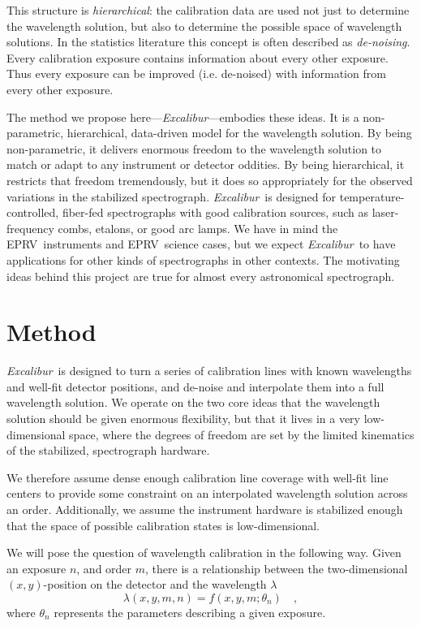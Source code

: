 \documentclass[twocolumn]{aastex63}
\newcommand{\project}[1]{\textsl{#1}}
\newcommand{\name}{\project{Excalibur}}
\newcommand{\acronym}[1]{{\small{#1}}}
\newcommand{\eprv}{\acronym{EPRV}}
\begin{document}
This structure is \emph{hierarchical}: the calibration data are used not just to determine the wavelength solution, but also to determine the possible space of wavelength solutions.  In the statistics literature this concept is often described as \emph{de-noising}.  Every calibration exposure contains information about every other exposure.  Thus every exposure can be improved (i.e. de-noised) with information from every other exposure.

The method we propose here---\name---embodies these ideas.
It is a non-parametric, hierarchical, data-driven model for the wavelength solution.  By being non-parametric, it delivers enormous freedom to the wavelength solution to match or adapt to any instrument or detector oddities.  By being hierarchical, it restricts that freedom tremendously, but it does so appropriately for the observed variations in the stabilized spectrograph.  \name\ is designed for temperature-controlled, fiber-fed spectrographs with good calibration sources, such as laser-frequency combs, etalons, or good arc lamps.  We have in mind the \eprv\ instruments and \eprv\ science cases, but we expect \name\ to have applications for other kinds of spectrographs in other contexts.  The motivating ideas behind this project are true for almost every astronomical spectrograph.

\section{Method} \label{sec:method}
\name\ is designed to turn a series of calibration lines with known wavelengths and well-fit detector positions, and de-noise and interpolate them into a full wavelength solution.  We operate on the two core ideas that the wavelength solution should be given enormous flexibility, but that it lives in a very low-dimensional space, where the degrees of freedom are set by the limited kinematics of the stabilized, spectrograph hardware.

We therefore assume dense enough calibration line coverage with well-fit line centers to provide some constraint on an interpolated wavelength solution across an order.  Additionally, we assume the instrument hardware is stabilized enough that the space of possible calibration states is low-dimensional.

We will pose the question of wavelength calibration in the following way.  Given an exposure $n$, and order $m$, there is a relationship between
the two-dimensional $(x,y)$-position on the detector and the
wavelength $\lambda$
\begin{equation}
\lambda(x,y,m,n) = f(x,y,m;\theta_{n})
\quad ,
\label{eq:wsol}
\end{equation}
where $\theta_{n}$ represents the parameters describing a given exposure.
\end{document}
